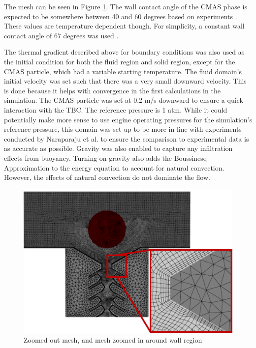 \documentclass{UCF_ETD}
\begin{document}
The mesh can be seen in Figure \ref{Fig3}. The wall contact angle of the CMAS phase is expected to be somewhere between 40 and 60 degrees based on experiments \cite{Naraparaju2019}. These values are temperature dependent though. For simplicity, a constant wall contact angle of 67 degrees was used \cite{Naraparaju2019}.  


The thermal gradient described above for boundary conditions was also used as the initial condition for both the fluid region and solid region, except for the CMAS particle, which had a variable starting temperature. The fluid domain's initial velocity was set such that there was a very small downward velocity. This is done because it helps with convergence in the first calculations in the simulation. The CMAS particle was set at 0.2 m/s downward to ensure a quick interaction with the TBC. The reference pressure is 1 atm. While it could potentially make more sense to use engine operating pressures for the simulation's reference pressure, this domain was set up to be more in line with experiments conducted by Naraparaju et al. \cite{Naraparaju2014, Naraparaju2017, Naraparaju2019} to ensure the comparison to experimental data is as accurate as possible. Gravity was also enabled to capture any infiltration effects from buoyancy. Turning on gravity also adds the Boussinesq Approximation to the energy equation to account for natural convection. However, the effects of natural convection do not dominate the flow.

\begin{figure}[htp!]
\centering
\includegraphics[width=\linewidth]{Figures/Fig3.png}
\caption{Zoomed out mesh, and  mesh zoomed in around wall region}
\label{Fig3}
\end{figure}
\end{document}
